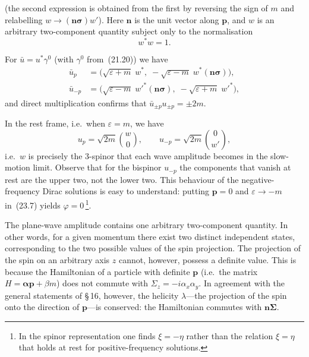 (the second expression is obtained from the first by reversing the sign of $m$ and relabelling $w \to (\mathbf{n}\boldsymbol{\sigma})w'$). Here $\mathbf{n}$ is the unit vector along $\mathbf{p}$, and $w$ is an arbitrary two-component quantity subject only to the normalisation
\begin{equation}
w^*w = 1.
\tag{23.10}
\end{equation}

For $\bar u = u^*\gamma^0$ (with $\gamma^0$ from~(21.20)) we have
\begin{equation}
\begin{aligned}
\bar u_p &= \bigl(\sqrt{\varepsilon + m}\;w^*,\; -\sqrt{\varepsilon - m}\;w^*(\mathbf{n}\boldsymbol{\sigma})\bigr),\\
\bar u_{-p} &= \bigl(\sqrt{\varepsilon - m}\;w'^*(\mathbf{n}\boldsymbol{\sigma}),\; -\sqrt{\varepsilon + m}\;w'^*\bigr),
\end{aligned}
\tag{23.11}
\end{equation}
and direct multiplication confirms that $\bar u_{\pm p}u_{\pm p} = \pm 2m$.

In the rest frame, i.e.\ when $\varepsilon = m$, we have
\begin{equation}
u_p = \sqrt{2m}\binom{w}{0},\qquad u_{-p} = \sqrt{2m}\binom{0}{w'},
\tag{23.12}
\end{equation}
i.e.\ $w$ is precisely the 3-spinor that each wave amplitude becomes in the slow-motion limit. Observe that for the bispinor $u_{-p}$ the components that vanish at rest are the upper two, not the lower two. This behaviour of the negative-frequency Dirac solutions is easy to understand: putting $\mathbf{p} = 0$ and $\varepsilon \to -m$ in~(23.7) yields $\varphi = 0$\,\footnote{In the spinor representation one finds $\xi = -\eta$ rather than the relation $\xi = \eta$ that holds at rest for positive-frequency solutions.}.

The plane-wave amplitude contains one arbitrary two-component quantity. In other words, for a given momentum there exist two distinct independent states, corresponding to the two possible values of the spin projection. The projection of the spin on an arbitrary axis $z$ cannot, however, possess a definite value. This is because the Hamiltonian of a particle with definite $\mathbf{p}$ (i.e.\ the matrix $H = \boldsymbol{\alpha}\mathbf{p} + \beta m$) does not commute with $\Sigma_z = -i\alpha_x\alpha_y$. In agreement with the general statements of \S\,16, however, the helicity $\lambda$---the projection of the spin onto the direction of $\mathbf{p}$---is conserved: the Hamiltonian commutes with $\mathbf{n}\boldsymbol{\Sigma}$.

